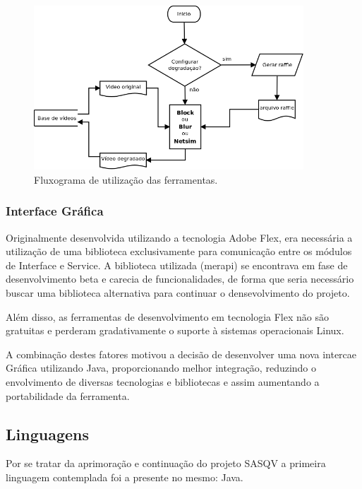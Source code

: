 \begin{figure}[!htb]
	\centering
	\includegraphics[width=0.9\textwidth]{./diagramas/fluxodegradacao.png}
	\caption{Fluxograma de utilização das ferramentas.}
	\label{fig:fluxogramaferramentas}
\end{figure}

\subsubsection{Interface Gráfica}

Originalmente desenvolvida utilizando a tecnologia Adobe Flex, era necessária a utilização de uma biblioteca exclusivamente para comunicação entre os módulos de Interface e Service. A biblioteca utilizada (merapi) se encontrava em fase de desenvolvimento beta e carecia de funcionalidades, de forma que seria necessário buscar uma biblioteca alternativa para continuar o densevolvimento do projeto.

Além disso, as ferramentas de desenvolvimento em tecnologia Flex não são gratuitas e perderam gradativamente o suporte à sistemas operacionais Linux.

A combinação destes fatores motivou a decisão de desenvolver uma nova intercae Gráfica utilizando Java, proporcionando melhor integração, reduzindo o envolvimento de diversas tecnologias e bibliotecas e assim aumentando a portabilidade da ferramenta.

\subsection{Linguagens}

Por se tratar da aprimoração e continuação do projeto SASQV a primeira linguagem contemplada foi a presente no mesmo: Java.

